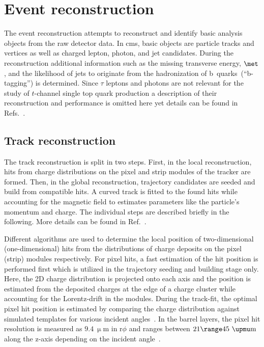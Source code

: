 \chapter{Event reconstruction}


The event reconstruction attempts to reconstruct and identify basic analysis objects from the raw detector data. In \gls{cms}, basic objects are particle tracks and vertices as well as charged lepton, photon, and jet candidates. During the reconstruction additional information such as the missing transverse energy, $\met$, and the likelihood of jets to originate from the hadronization of b~quarks~(``b-tagging'') is determined. Since $\tau$ leptons and photons are not relevant for the study of $t$-channel single top quark production a description of their reconstruction and performance is omitted here yet details can be found in Refs.~\cite{Khachatryan:2015iwa,Khachatryan:2015dfa}.


\section{Track reconstruction}

The track reconstruction is split in two steps. First, in the local reconstruction, hits from charge distributions on the pixel and strip modules of the tracker are formed. Then, in the global reconstruction, trajectory candidates are seeded and build from compatible hits. A curved track is fitted to the found hits while accounting for the magnetic field to estimates parameters like the particle's momentum and charge. The individual steps are described briefly in the following. More details can be found in Ref.~\cite{Chatrchyan:2014fea}.

Different algorithms are used to determine the local position of two-dimensional (one-dimensional) hits from the distributions of charge deposits on the pixel (strip) modules respectively. For pixel hits, a fast estimation of the hit position is performed first which is utilized in the trajectory seeding and building stage only. Here, the 2D charge distribution is projected onto each axis and the position is estimated from the deposited charges at the edge of a charge cluster while accounting for the Lorentz-drift in the modules. During the track-fit, the optimal pixel hit position is estimated by comparing the charge distribution against simulated templates for various incident angles~\cite{Swartz:2007zz}. In the barrel layers, the pixel hit resolution is measured as $9.4~\upmu\mathrm{m}$ in $\mathrm{r}\phi$ and ranges between $21\range45~\upmu\mathrm{m}$ along the z-axis depending on the incident angle~\cite{Chatrchyan:2014fea}. 

